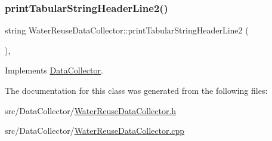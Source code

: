 \subsubsection{\texorpdfstring{print\+Tabular\+String\+Header\+Line2()}{printTabularStringHeaderLine2()}}
{\footnotesize\ttfamily string Water\+Reuse\+Data\+Collector\+::print\+Tabular\+String\+Header\+Line2 (\begin{DoxyParamCaption}{ }\end{DoxyParamCaption})\hspace{0.3cm}{\ttfamily [override]}, {\ttfamily [virtual]}}



Implements \mbox{\hyperlink{classDataCollector_af01ea961314be2164f39e6d4cd59e443}{Data\+Collector}}.



The documentation for this class was generated from the following files\+:\begin{DoxyCompactItemize}
\item 
src/\+Data\+Collector/\mbox{\hyperlink{WaterReuseDataCollector_8h}{Water\+Reuse\+Data\+Collector.\+h}}\item 
src/\+Data\+Collector/\mbox{\hyperlink{WaterReuseDataCollector_8cpp}{Water\+Reuse\+Data\+Collector.\+cpp}}\end{DoxyCompactItemize}

